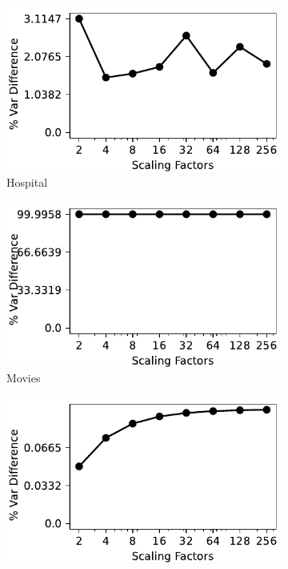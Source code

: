 \begin{figure}[!t]
\begin{subfigure}{0.32\textwidth}
    \includegraphics[width=\textwidth]{figures/plot/var/variance_diff_hospital.pdf}
    \caption{Hospital}
    \label{fig:var_hospitals}
\end{subfigure}
\hfill
\begin{subfigure}{0.32\textwidth}
    \includegraphics[width=\textwidth]{figures/plot/var/variance_diff_movies.pdf}
    \caption{Movies}
    \label{exp:var_movies}
\end{subfigure}
\hfill
\begin{subfigure}{0.32\textwidth}
    \includegraphics[width=\textwidth]{figures/plot/var/variance_diff_rayyan.pdf}

\end{subfigure}
\end{figure}
